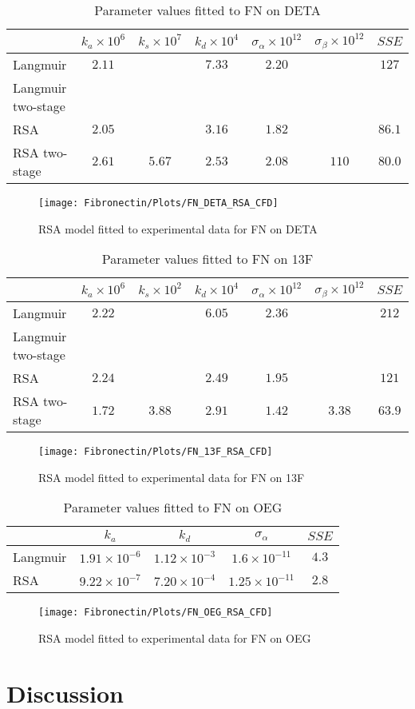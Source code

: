 %
\begin{table}
\caption{\label{tab:FN on DETA}Parameter values fitted to FN on DETA}


\begin{tabular}{lcccccc}
 & $k_{a}\times10^{6}$ & $k_{s}\times10^{7}$ & $k_{d}\times10^{4}$ & $\sigma_{\alpha}\times10^{12}$ & $\sigma_{\beta}\times10^{12}$ & $SSE$\tabularnewline
\hline
Langmuir & $2.11$ &  & $7.33$ & $2.20$ &  & $127$\tabularnewline
Langmuir two-stage & $ $ & $ $ & $ $ & $ $ & $ $ & $ $\tabularnewline
RSA & $2.05$ &  & $3.16$ & $1.82$ &  & $86.1$\tabularnewline
RSA two-stage & $2.61$ & $5.67$ & $2.53$ & $2.08$ & $110$ & $80.0$\tabularnewline
\end{tabular}
\end{table}


%
\begin{figure}
\texttt{[image: Fibronectin/Plots/FN\_DETA\_RSA\_CFD]}

\caption{\label{fig:FN DETA RSA}RSA model fitted to experimental data for
FN on DETA}



\end{figure}


%
\begin{table}
\caption{\label{tab:FN on 13F}Parameter values fitted to FN on 13F}


\begin{tabular}{lcccccc}
 & $k_{a}\times10^{6}$ & $k_{s}\times10^{2}$ & $k_{d}\times10^{4}$ & $\sigma_{\alpha}\times10^{12}$ & $\sigma_{\beta}\times10^{12}$ & $SSE$\tabularnewline
\hline
Langmuir & $2.22$ &  & $6.05$ & $2.36$ &  & $212$\tabularnewline
Langmuir two-stage & $ $ & $ $ & $ $ & $ $ & $ $ & $ $\tabularnewline
RSA & $2.24$ &  & $2.49$ & $1.95$ &  & $121$\tabularnewline
RSA two-stage & $1.72$ & $3.88$ & $2.91$ & $1.42$ & $3.38$ & $63.9$\tabularnewline
\end{tabular}
\end{table}


%
\begin{figure}
\texttt{[image: Fibronectin/Plots/FN\_13F\_RSA\_CFD]}

\caption{\label{fig:FN 13F RSA}RSA model fitted to experimental data for FN
on 13F}

\end{figure}
%
\begin{table}
\caption{\label{tab:FN on OEG}Parameter values fitted to FN on OEG}


\begin{tabular}{lcccc}
 & $k_{a}$ & $k_{d}$ & $\sigma_{\alpha}$ & $SSE$\tabularnewline
\hline
Langmuir & $1.91\times10^{-6}$ & $1.12\times10^{-3}$ & $1.6\times10^{-11}$ & $4.3$\tabularnewline
RSA & $9.22\times10^{-7}$ & $7.20\times10^{-4}$ & $1.25\times10^{-11}$ & $2.8$\tabularnewline
\end{tabular}
\end{table}
%
\begin{figure}
\texttt{[image: Fibronectin/Plots/FN\_OEG\_RSA\_CFD]}

\caption{\label{fig:FN OEG RSA}RSA model fitted to experimental data for FN
on OEG}

\end{figure}



\section{Discussion}

